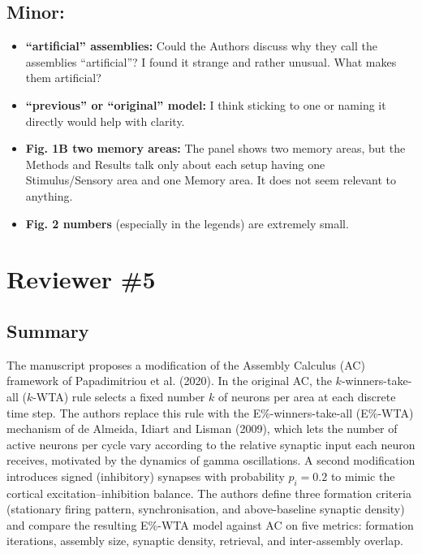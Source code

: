 \documentclass[a4paper, 11pt]{article}
\begin{document}
\subsection*{Minor:}
\begin{itemize}
    \item \textbf{``artificial'' assemblies:} Could the Authors discuss why they call the assemblies ``artificial''? I found it strange and rather unusual. What makes them artificial?
    
    \item \textbf{``previous'' or ``original'' model:} I think sticking to one or naming it directly would help with clarity.
    
    \item \textbf{Fig. 1B two memory areas:} The panel shows two memory areas, but the Methods and Results talk only about each setup having one Stimulus/Sensory area and one Memory area. It does not seem relevant to anything.
    
    \item \textbf{Fig. 2 numbers} (especially in the legends) are extremely small.
\end{itemize}


\section*{Reviewer \#5}

\subsection*{Summary}
The manuscript proposes a modification of the Assembly Calculus (AC) framework of Papadimitriou et al. (2020). In the original AC, the $k$-winners-take-all ($k$-WTA) rule selects a fixed number $k$ of neurons per area at each discrete time step. The authors replace this rule with the E\%-winners-take-all (E\%-WTA) mechanism of de Almeida, Idiart and Lisman (2009), which lets the number of active neurons per cycle vary according to the relative synaptic input each neuron receives, motivated by the dynamics of gamma oscillations. A second modification introduces signed (inhibitory) synapses with probability $p_i = 0.2$ to mimic the cortical excitation–inhibition balance. The authors define three formation criteria (stationary firing pattern, synchronisation, and above-baseline synaptic density) and compare the resulting E\%-WTA model against AC on five metrics: formation iterations, assembly size, synaptic density, retrieval, and inter-assembly overlap.
\end{document}
